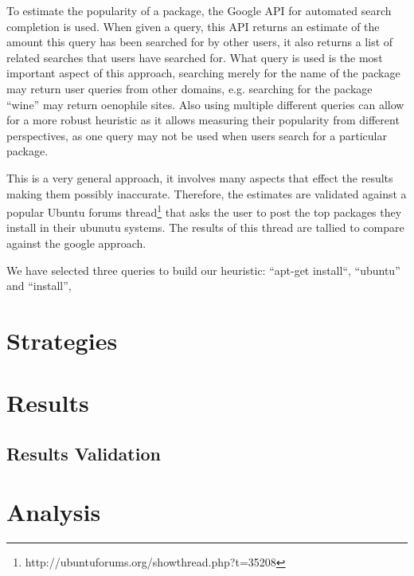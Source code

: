 To estimate the popularity of a package, the Google API for automated search completion is used.
When given a query, this API returns an estimate of the amount this query has been searched for by other users,
it also returns a list of related searches that users have searched for.
What query is used is the most important aspect of this approach,
searching merely for the name of the package may return user queries from other domains, e.g. searching for the package ``wine'' may return oenophile sites.
Also using multiple different queries can allow for a more robust heuristic as it allows measuring their popularity from different perspectives,
as one query may not be used when users search for a particular package.

This is a very general approach, it involves many aspects that effect the results making them possibly inaccurate.
Therefore, the estimates are validated against a popular Ubuntu forums thread\footnote{http://ubuntuforums.org/showthread.php?t=35208} 
that asks the user to post the top packages they install in their ubunutu systems. 
The results of this thread are tallied to compare against the google approach.

We have selected three queries to build our heuristic:
``apt-get install``, ``ubuntu'' and ``install'', 


\section{Strategies}

\section{Results}

\subsection{Results Validation}

\section{Analysis}

